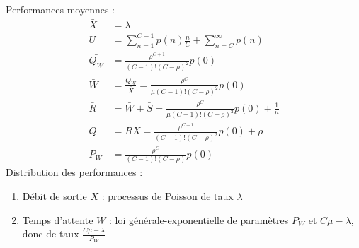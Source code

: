 \documentclass[french]{scrartcl}
\begin{document}
\begin{multicols}{3}
\begin{fleqn}
{Performances moyennes : 
\begin{align*}
\bar{X} & =\lambda\\
\bar{U} & =\sum_{n=1}^{C-1}p\left(n\right)\frac{n}{C}+\sum_{n=C}^{\infty}p\left(n\right)\\
\bar{Q_{W}} & =\frac{\rho^{C+1}}{\left(C-1\right)!\left(C-\rho\right)^{2}}p\left(0\right)\\
\bar{W} & =\frac{\bar{Q_{W}}}{\bar{X}}=\frac{\rho^{C}}{\mu\left(C-1\right)!\left(C-\rho\right)^{2}}p\left(0\right)\\
\bar{R} & =\bar{W}+\bar{S}=\frac{\rho^{C}}{\mu\left(C-1\right)!\left(C-\rho\right)^{2}}p\left(0\right)+\frac{1}{\mu}\\
\bar{Q} & =\bar{R}\bar{X}=\frac{\rho^{C+1}}{\left(C-1\right)!\left(C-\rho\right)^{2}}p\left(0\right)+\rho\\
P_{W} & =\frac{\rho^{C}}{\left(C-1\right)!\left(C-\rho\right)}p\left(0\right)
\end{align*}
Distribution des performances :
\begin{enumerate}[label=--]
	\item Débit de sortie $X$ : processus de Poisson de taux $\lambda$
	\item Temps d'attente $W$ : loi générale-exponentielle de paramètres $P_W$ et $C\mu-\lambda$, donc de taux $\frac{C\mu-\lambda}{P_W}$
\end{enumerate}
}


\end{fleqn}
\end{multicols}
\end{document}
